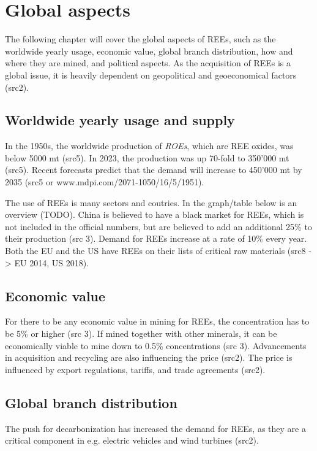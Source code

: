 
\section{Global aspects}

The following chapter will cover the global aspects of REEs, such as the worldwide yearly usage, economic value, global branch distribution, how and where they are mined, and political aspects. As the acquisition of REEs is a global issue, it is heavily dependent on geopolitical and geoeconomical factors (src2).

\subsection{Worldwide yearly usage and supply}

In the 1950s, the worldwide production of \textit{ROEs}, which are REE oxides, was below 5000 mt (src5). In 2023, the production was up 70-fold to 350'000 mt (src5). Recent forecasts predict that the demand will increase to 450'000 mt by 2035 (src5 or www.mdpi.com/2071-1050/16/5/1951).

The use of REEs is many sectors and coutries. In the graph/table below is an overview (TODO). China is believed to have a black market for REEs, which is not included in the official numbers, but are believed to add an additional 25\% to their production (src 3). Demand for REEs increase at a rate of 10\% every year. Both the EU and the US have REEs on their lists of critical raw materials (src8 -> EU 2014, US 2018).

\subsection{Economic value}

For there to be any economic value in mining for REEs, the concentration has to be 5\% or higher (src 3). If mined together with other minerals, it can be economically viable to mine down to 0.5\% concentrations (src 3). Advancements in acquisition and recycling are also influencing the price (src2). The price is influenced by export regulations, tariffs, and trade agreements (src2).

\subsection{Global branch distribution}

The push for decarbonization has increased the demand for REEs, as they are a critical component in e.g. electric vehicles and wind turbines (src2).

